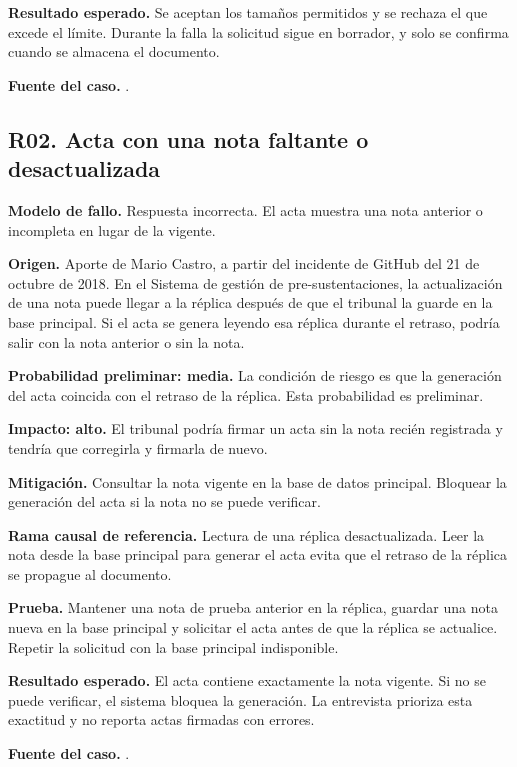 \textbf{Resultado esperado.} Se aceptan los tamaños permitidos y se rechaza el que excede el límite. Durante la falla la solicitud sigue en borrador, y solo se confirma cuando se almacena el documento.

\textbf{Fuente del caso.} \cite{Rockwell2021FastlyOutage}.

\subsection{R02. Acta con una nota faltante o desactualizada}

\textbf{Modelo de fallo.} Respuesta incorrecta. El acta muestra una nota anterior o incompleta en lugar de la vigente.

\textbf{Origen.} Aporte de Mario Castro, a partir del incidente de GitHub del 21 de octubre de 2018. En el Sistema de gestión de pre-sustentaciones, la actualización de una nota puede llegar a la réplica después de que el tribunal la guarde en la base principal. Si el acta se genera leyendo esa réplica durante el retraso, podría salir con la nota anterior o sin la nota.

\textbf{Probabilidad preliminar: media.} La condición de riesgo es que la generación del acta coincida con el retraso de la réplica. Esta probabilidad es preliminar.

\textbf{Impacto: alto.} El tribunal podría firmar un acta sin la nota recién registrada y tendría que corregirla y firmarla de nuevo.

\textbf{Mitigación.} Consultar la nota vigente en la base de datos principal. Bloquear la generación del acta si la nota no se puede verificar.

\textbf{Rama causal de referencia.} Lectura de una réplica desactualizada. Leer la nota desde la base principal para generar el acta evita que el retraso de la réplica se propague al documento.

\textbf{Prueba.} Mantener una nota de prueba anterior en la réplica, guardar una nota nueva en la base principal y solicitar el acta antes de que la réplica se actualice. Repetir la solicitud con la base principal indisponible.

\textbf{Resultado esperado.} El acta contiene exactamente la nota vigente. Si no se puede verificar, el sistema bloquea la generación. La entrevista prioriza esta exactitud y no reporta actas firmadas con errores.

\textbf{Fuente del caso.} \cite{Warner2018GitHubIncident}.

